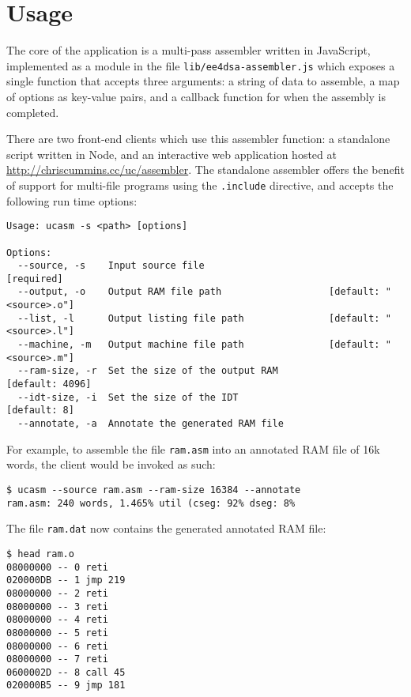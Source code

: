 \documentclass[12pt,twoside]{report}
\begin{document}
\newpage
\section{Usage}

The core of the application is a multi-pass assembler written in
JavaScript, implemented as a module in the file
\texttt{lib/ee4dsa-assembler.js} which exposes a single function that
accepts three arguments: a string of data to assemble, a map of
options as key-value pairs, and a callback function for when the
assembly is completed.

There are two front-end clients which use this assembler function: a
standalone script written in Node, and an interactive web application
hosted at \url{http://chriscummins.cc/uc/assembler}. The standalone
assembler offers the benefit of support for multi-file programs using
the \texttt{.include} directive, and accepts the following run time
options:

\begin{verbatim}
Usage: ucasm -s <path> [options]

Options:
  --source, -s    Input source file                                   [required]
  --output, -o    Output RAM file path                   [default: "<source>.o"]
  --list, -l      Output listing file path               [default: "<source>.l"]
  --machine, -m   Output machine file path               [default: "<source>.m"]
  --ram-size, -r  Set the size of the output RAM                 [default: 4096]
  --idt-size, -i  Set the size of the IDT                           [default: 8]
  --annotate, -a  Annotate the generated RAM file
\end{verbatim}

\noindent
For example, to assemble the file \texttt{ram.asm} into an annotated
RAM file of 16k words, the client would be invoked as such:

\begin{verbatim}
$ ucasm --source ram.asm --ram-size 16384 --annotate
ram.asm: 240 words, 1.465% util (cseg: 92% dseg: 8%
\end{verbatim}

\noindent
The file \texttt{ram.dat} now contains the generated annotated RAM
file:

\begin{verbatim}
$ head ram.o
08000000 -- 0 reti
020000DB -- 1 jmp 219
08000000 -- 2 reti
08000000 -- 3 reti
08000000 -- 4 reti
08000000 -- 5 reti
08000000 -- 6 reti
08000000 -- 7 reti
0600002D -- 8 call 45
020000B5 -- 9 jmp 181
\end{verbatim}
\end{document}
